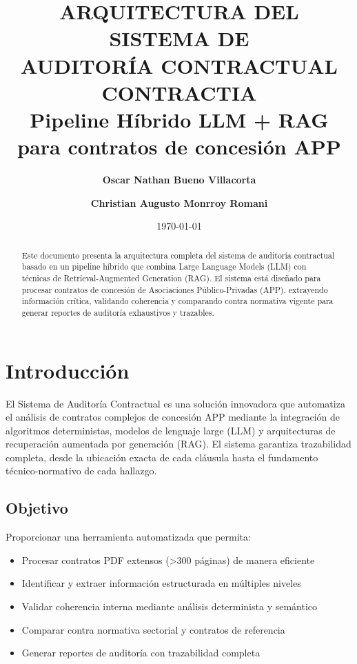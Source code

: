 \documentclass[12pt,a4paper]{article}
\title{\textbf{ARQUITECTURA DEL SISTEMA DE\\AUDITORÍA CONTRACTUAL\\CONTRACTIA}\\[0.5em]
\large Pipeline Híbrido LLM + RAG para contratos de concesión APP}
\author{
\textbf{Oscar Nathan Bueno Villacorta}\\
\and
\textbf{Christian Augusto Monrroy Romani}\\
}
\date{\today}
\begin{document}
\maketitle
\thispagestyle{empty}

\vspace{1cm}

\begin{abstract}
Este documento presenta la arquitectura completa del sistema de auditoría contractual basado en un pipeline híbrido que combina Large Language Models (LLM) con técnicas de Retrieval-Augmented Generation (RAG). El sistema está diseñado para procesar contratos de concesión de Asociaciones Público-Privadas (APP), extrayendo información crítica, validando coherencia y comparando contra normativa vigente para generar reportes de auditoría exhaustivos y trazables.
\end{abstract}

\newpage
\tableofcontents
\newpage

\section{Introducción}

El Sistema de Auditoría Contractual es una solución innovadora que automatiza el análisis de contratos complejos de concesión APP mediante la integración de algoritmos deterministas, modelos de lenguaje large (LLM) y arquitecturas de recuperación aumentada por generación (RAG). El sistema garantiza trazabilidad completa, desde la ubicación exacta de cada cláusula hasta el fundamento técnico-normativo de cada hallazgo.

\subsection{Objetivo}

Proporcionar una herramienta automatizada que permita:
\begin{itemize}[leftmargin=*]
    \item Procesar contratos PDF extensos (>300 páginas) de manera eficiente
    \item Identificar y extraer información estructurada en múltiples niveles
    \item Validar coherencia interna mediante análisis determinista y semántico
    \item Comparar contra normativa sectorial y contratos de referencia
    \item Generar reportes de auditoría con trazabilidad completa
\end{itemize}
\end{document}
